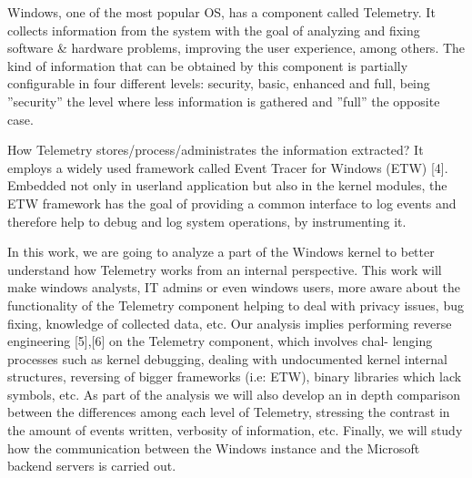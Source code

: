 Windows, one of the most popular OS, has a component called Telemetry. It collects information from the system with the goal of analyzing and fixing software \& hardware problems, improving the user experience, among others. The kind of information that can be obtained by this component is partially configurable in four different levels: security, basic, enhanced and full, being ”security” the level where less information is gathered and ”full” the opposite case.  

How Telemetry stores/process/administrates the information extracted? It employs a widely used framework called Event Tracer for Windows (ETW) [4]. Embedded not only in userland application but also in the kernel modules, the ETW framework has the goal of providing a common interface to log events and
therefore help to debug and log system operations, by instrumenting it.

In this work, we are going to analyze a part of the Windows kernel to better understand how Telemetry works from an internal perspective. This work will make windows analysts, IT admins or even windows users, more aware about the functionality of the Telemetry component helping to deal with privacy issues, bug fixing, knowledge of collected data, etc. Our analysis implies performing reverse engineering [5],[6] on the Telemetry component, which involves chal- lenging processes such as kernel debugging, dealing with undocumented kernel internal structures, reversing of bigger frameworks (i.e: ETW), binary libraries which lack symbols, etc. As part of the analysis we will also develop an in depth comparison between the differences among each level of Telemetry, stressing the contrast in the amount of events written, verbosity of information, etc. Finally, we will study how the communication between the Windows instance and the Microsoft backend servers is carried out.
